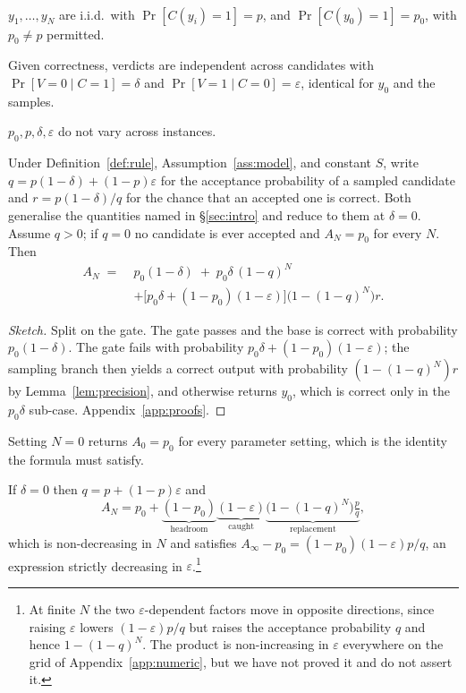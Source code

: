 \documentclass[11pt]{article}
\begin{document}
\begin{assumption}\label{ass:model}\ \\[-1.2em]
\begin{description}\setlength\itemsep{0.1em}
\item[A1] $y_1,\dots,y_N$ are i.i.d.\ with $\Pr[C(y_i){=}1]=p$, and $\Pr[C(y_0){=}1]=p_0$, with $p_0\neq p$ permitted.
\item[A2] Given correctness, verdicts are independent across candidates with $\Pr[V{=}0\mid C{=}1]=\delta$ and $\Pr[V{=}1\mid C{=}0]=\varepsilon$, identical for $y_0$ and the samples.
\item[A3] $p_0,p,\delta,\varepsilon$ do not vary across instances.
\end{description}
\end{assumption}

\begin{theorem}\label{thm:master}
Under Definition~\ref{def:rule}, Assumption~\ref{ass:model}, and constant $S$, write $q=p(1-\delta)+(1-p)\varepsilon$ for the acceptance probability of a sampled candidate and $r=p(1-\delta)/q$ for the chance that an accepted one is correct. Both generalise the quantities named in \S\ref{sec:intro} and reduce to them at $\delta=0$. Assume $q>0$; if $q=0$ no candidate is ever accepted and $A_N=p_0$ for every $N$. Then
\[
\begin{aligned}
A_N \;=\;& p_0(1-\delta) \;+\; p_0\delta\,(1-q)^N \\
&+\bigl[p_0\delta+(1-p_0)(1-\varepsilon)\bigr]\bigl(1-(1-q)^N\bigr)r .
\end{aligned}
\]
\end{theorem}
\begin{proof}[Sketch]
Split on the gate. The gate passes and the base is correct with probability $p_0(1-\delta)$. The gate fails with probability $p_0\delta+(1-p_0)(1-\varepsilon)$; the sampling branch then yields a correct output with probability $(1-(1-q)^N)r$ by Lemma~\ref{lem:precision}, and otherwise returns $y_0$, which is correct only in the $p_0\delta$ sub-case. Appendix~\ref{app:proofs}.
\end{proof}

Setting $N=0$ returns $A_0=p_0$ for every parameter setting, which is the identity the formula must satisfy.

\begin{corollary}\label{cor:gain}
If $\delta=0$ then $q=p+(1-p)\varepsilon$ and
\[
A_N=p_0+\underbrace{(1-p_0)}_{\text{headroom}}\underbrace{(1-\varepsilon)}_{\text{caught}}\underbrace{\bigl(1-(1-q)^N\bigr)\tfrac{p}{q}}_{\text{replacement}} ,
\]
which is non-decreasing in $N$ and satisfies $A_\infty-p_0=(1-p_0)(1-\varepsilon)p/q$, an expression strictly decreasing in $\varepsilon$.\footnote{At finite $N$ the two $\varepsilon$-dependent factors move in opposite directions, since raising $\varepsilon$ lowers $(1-\varepsilon)p/q$ but raises the acceptance probability $q$ and hence $1-(1-q)^N$. The product is non-increasing in $\varepsilon$ everywhere on the grid of Appendix~\ref{app:numeric}, but we have not proved it and do not assert it.}
\end{corollary}
\end{document}

